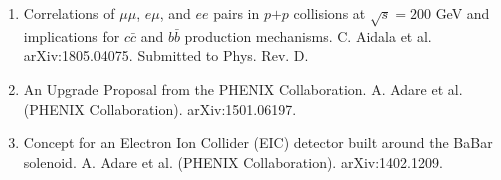 \documentclass[11pt]{article}
\begin{document}
\begin{flushleft}
\begin{center}
\begin{enumerate}
			
		\item Correlations of $\mu\mu$, $e\mu$, and $ee$ pairs in $p$$+$$p$ collisions at $\sqrt{s}=200$ GeV and implications for $c\bar{c}$ and $b\bar{b}$ production mechanisms. C. Aidala et al. arXiv:1805.04075. Submitted to Phys. Rev. D.
		\item An Upgrade Proposal from the PHENIX Collaboration. A. Adare et al. (PHENIX Collaboration). arXiv:1501.06197.
		\item Concept for an Electron Ion Collider (EIC) detector built around the BaBar solenoid. A. Adare et al. (PHENIX Collaboration). arXiv:1402.1209.
		
\end{enumerate}
	
\end{center}


\end{flushleft}









\end{document}
